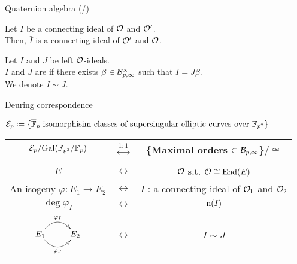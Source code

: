 \begin{frame}{Quaternion algebra (/\quatotal{})}
    \begin{lemma}
        Let $I$ be a connecting ideal of $\mathcal{O}$ and $\mathcal{O}'$.\\
        Then, $\bar{I}$ is a connecting ideal of $\mathcal{O}'$ and $\mathcal{O}$.
    \end{lemma}

    \vspace{10pt}
    \begin{definition}
        Let $I$ and $J$ be left $\mathcal{O}$-ideals.\\
        $I$ and $J$ are 
        if there exists $\beta \in \mathcal{B}_{p,\infty}^{\times}$ such that $I = J\beta$.\\
        We denote $I \sim J$.
    \end{definition}
\end{frame}

\begin{frame}{Deuring correspondence}

    {\fontsize{11pt}{13pt}\selectfont
    $\mathcal{E}_p \coloneqq \{\overline{\mathbb{F}}_p\mbox{-isomorphisim classes of supersingular elliptic curves over }\mathbb{F}_{p^2} \}$\\
    \begin{itembox}{}
        \begin{center}
            \begin{tabular}{ccc}
                $\mathcal{E}_p/\mathrm{Gal}(\mathbb{F}_{p^2}/\mathbb{F}_p)$ & $\stackrel{1:1}{\longleftrightarrow}$
                    & \{Maximal orders $\subset \mathcal{B}_{p,\infty}$\}$/\cong$\\[5pt]\hline\\[5pt]
                $E$  & $\longleftrightarrow$
                    & $\mathcal{O}$ s.t. $\mathcal{O} \cong \mathrm{End}(E)$\\[7pt]
                An isogeny $\varphi: E_1 \to E_2$ & $\longleftrightarrow$
                    & $I$ : a connecting ideal of $\mathcal{O}_1$ and $\mathcal{O}_2$\\[7pt]
                $\deg\varphi_I$ & $\longleftrightarrow$ & $\mathrm{n}(I)$\\[7pt]
                $\xymatrix{
                    E_1 \ar@/^15pt/[r]^{{\varphi_I}} \ar@/_15pt/[r]_{{\varphi_J}} & E_2
                }$ & $\longleftrightarrow$ & $I \sim J$
            \end{tabular}
        \end{center}
    \end{itembox}
    }
\end{frame}

